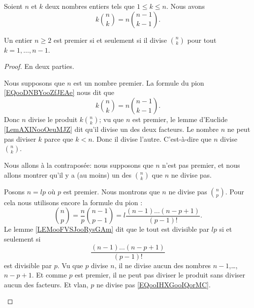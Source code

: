 \begin{lemma}	\label{LEMooYBOIooEtVfDQ}
	Soient \( n\) et \( k\) deux nombres entiers tels que \( 1\leq k\leq n\). Nous avons
	\begin{equation}		\label{EQooDNBYooZfJEAe}
		k\binom{ n }{ k }=n\binom{ n-1 }{ k-1 }.
	\end{equation}
\end{lemma}

\begin{proposition}	\label{PROPooVPOYooNNugWU}
	Un entier \( n\geq 2\) est premier si et seulement si il divise \( \binom{ n }{ k }\) pour tout \( k=1,\ldots,n-1\).
\end{proposition}

\begin{proof}
	En deux parties.
	\begin{subproof}
		\spitem[\( \Rightarrow\)]
		Nous supposons que \( n\) est un nombre premier. La formule du pion \eqref{EQooDNBYooZfJEAe} nous dit que
		\begin{equation}
			k\binom{ n }{ k }=n\binom{ n-1 }{ k-1 }.
		\end{equation}
		Donc \( n\) divise le produit \(k\binom{ n }{ k }\); vu que \( n\) est premier, le lemme d'Euclide \ref{LemAXINooOeuMJZ} dit qu'il divise un des deux facteurs. Le nombre \( n\) ne peut pas diviser \( k\) parce que \( k<n\). Donc il divise l'autre. C'est-à-dire que \( n\) divise \( \binom{ n }{ k }\).

		\spitem[\( \Leftarrow\)]
		Nous allons à la contraposée: nous supposons que \( n\) n'est pas premier, et nous allons montrer qu'il y a (au moins) un des \( \binom{ n }{ k }\) que \( n\) ne divise pas.

		Posons \( n=lp\) où \( p\) est premier. Nous montrons que \( n\) ne divise pas \( \binom{ n }{ p }\). Pour cela nous utilisons encore la formule du pion :
		\begin{equation}
			\binom{ n }{ p }=\frac{ n }{ p }\binom{ n-1 }{ p-1 }=l\frac{ (n-1)\ldots (n-p+1) }{ (p-1)! }.
		\end{equation}
		Le lemme \ref{LEMooFVSJooRysGAm} dit que le tout est divisible par \( lp\) si et seulement si
		\begin{equation}		\label{EQooIHXGooIQorMC}
			\frac{ (n-1)\ldots (n-p+1) }{ (p-1)! }
		\end{equation}
		est divisible par \( p\). Vu que \( p\) divise \( n\), il ne divise aucun des nombres \( n-1\),\ldots,\( n-p+1\). Et comme \( p\) est premier, il ne peut pas diviser le produit sans diviser aucun des facteurs. Et vlan, \( p\) ne divise pas \eqref{EQooIHXGooIQorMC}.
	\end{subproof}
\end{proof}

